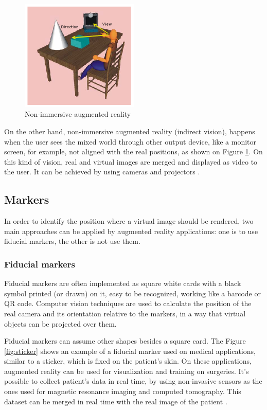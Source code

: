 \documentclass[msc, a4paper, classic, en]{ufbathesis}
\begin{document}
\begin{figure}
\label{fig:indirect}
\centering
\includegraphics[width=0.5\textwidth]{images/indirect.png}
\caption{Non-immersive augmented reality}
\end{figure}

On the other hand, non-immersive augmented reality (indirect vision), happens when the user sees the mixed world through other output device, like a monitor screen, for example, not aligned with the real positions, as shown on Figure \ref{fig:indirect}. On this kind of vision, real and virtual images are merged and displayed as video to the user. It can be achieved by using cameras and projectors \cite{tori2006fundamentos}.

\subsection{Markers}

In order to identify the position where a virtual image should be rendered, two main approaches can be applied by augmented reality applications: one is to use fiducial markers, the other is not use them.

\subsubsection{Fiducial markers}

Fiducial markers are often implemented as square white cards with a black symbol printed (or drawn) on it, easy to be recognized, working like a barcode or QR code. Computer vision techniques are used to calculate the position of the real camera and its orientation relative to the markers, in a way that virtual objects can be projected over them.

Fiducial markers can assume other shapes besides a square card. The Figure \ref{fig:sticker} shows an example of a fiducial marker used on medical applications, similar to a sticker, which is fixed on the patient's skin. On these applications, augmented reality can be used for visualization and training on surgeries. It's possible to collect patient's data in real time, by using non-invasive sensors as the ones used for magnetic resonance imaging and computed tomography. This dataset can be merged in real time with the real image of the patient \cite{azuma}.
\end{document}
